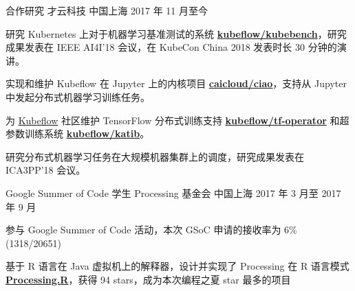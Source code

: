 

\begin{cventries}

  \cventry
    {合作研究} %
    {才云科技} %
    {中国上海} %
    {2017 年 11 月至今} %
    {
      \begin{cvitems} %
        \item 研究 Kubernetes 上对于机器学习基准测试的系统 \href{https://github.com/kubeflow/kubebench}{\bf kubeflow/kubebench}，研究成果发表在 IEEE AI4I'18 会议，在 KubeCon China 2018 发表时长 30 分钟的演讲。
        \item 实现和维护 Kubeflow 在 Jupyter 上的内核项目 \href{https://github.com/caicloud/ciao}{\bf caicloud/ciao}，支持从 Jupyter 中发起分布式机器学习训练任务。
        \item 为 \href{https://github.com/kubeflow/kubeflow}{Kubeflow} 社区维护 TensorFlow 分布式训练支持 \href{https://github.com/kubeflow/tf-operator}{\bf kubeflow/tf-operator} 和超参数训练系统 \href{https://github.com/kubeflow/katib}{\bf kubeflow/katib}。
        \item 研究分布式机器学习任务在大规模机器集群上的调度，研究成果发表在 ICA3PP'18 会议。
      \end{cvitems}
    }

  \cventry
    {Google Summer of Code 学生} %
    {Processing 基金会} %
    {中国上海} %
    {2017 年 3 月至 2017 年 9 月} %
    {
      \begin{cvitems} %
        \item 参与 Google Summer of Code 活动，本次 GSoC 申请的接收率为 6\%(1318/20651)
        \item 基于 R 语言在 Java 虚拟机上的解释器，设计并实现了 Processing 在 R 语言模式 \href{https://github.com/gaocegege/Processing.R}{\bf Processing.R}，获得 94 stars，成为本次编程之夏 star 最多的项目
      \end{cvitems}
    }

\end{cventries}

